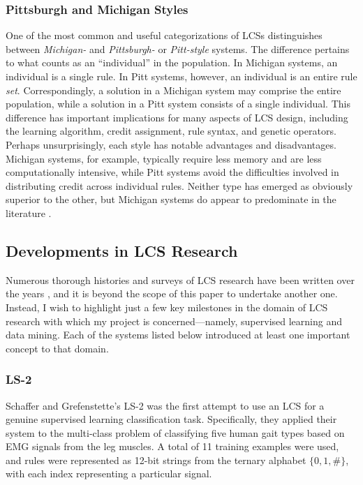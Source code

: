 \documentclass[12pt,twoside]{article}
\begin{document}
\subsubsection{Pittsburgh and Michigan Styles}

One of the most common and useful categorizations of LCSs distinguishes between \emph{Michigan-} and \emph{Pittsburgh-} or \emph{Pitt-style} systems. The difference pertains to what counts as an ``individual'' in the population. In Michigan systems, an individual is a single rule. In Pitt systems, however, an individual is an entire rule \emph{set}. Correspondingly, a solution in a Michigan system may comprise the entire population, while a solution in a Pitt system consists of a single individual. This difference has important implications for many aspects of LCS design, including the learning algorithm, credit assignment, rule syntax, and genetic operators. Perhaps unsurprisingly, each style has notable advantages and disadvantages. Michigan systems, for example, typically require less memory and are less computationally intensive, while Pitt systems avoid the difficulties involved in distributing credit across individual rules. Neither type has emerged as obviously superior to the other, but Michigan systems do appear to predominate in the literature \cite{urbanowicz_learning_2009}.

\subsection{Developments in LCS Research}

Numerous thorough histories and surveys of LCS research have been written over the years \cite{urbanowicz_learning_2009, lanzi_roadmap_2000, wilson_critical_1989, wilson_state_2000}, and it is beyond the scope of this paper to undertake another one. Instead, I wish to highlight just a few key milestones in the domain of LCS research with which my project is concerned---namely, supervised learning and data mining. Each of the systems listed below introduced at least one important concept to that domain.

\subsubsection{LS-2}

Schaffer and Grefenstette's LS-2 \cite{schaffer_multi-objective_1985} was the first attempt to use an LCS for a genuine supervised learning classification task. Specifically, they applied their system to the multi-class problem of classifying five human gait types based on EMG signals from the leg muscles. A total of 11 training examples were used, and rules were represented as 12-bit strings from the ternary alphabet $\{0,1,\#\}$, with each index representing a particular signal.
\end{document}
